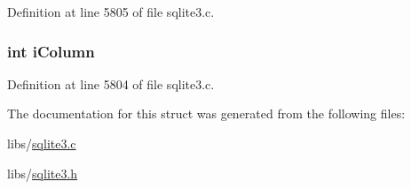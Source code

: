 Definition at line 5805 of file sqlite3.\+c.

\hypertarget{structsqlite3__index__info_1_1sqlite3__index__orderby_a64afc1df38f1cd02b956e9dd963c0b97}{}
\subsubsection[{i\+Column}]{\setlength{\rightskip}{0pt plus 5cm}int i\+Column}\label{structsqlite3__index__info_1_1sqlite3__index__orderby_a64afc1df38f1cd02b956e9dd963c0b97}


Definition at line 5804 of file sqlite3.\+c.



The documentation for this struct was generated from the following files\+:\begin{DoxyCompactItemize}
\item 
libs/\hyperlink{sqlite3_8c}{sqlite3.\+c}\item 
libs/\hyperlink{sqlite3_8h}{sqlite3.\+h}\end{DoxyCompactItemize}
